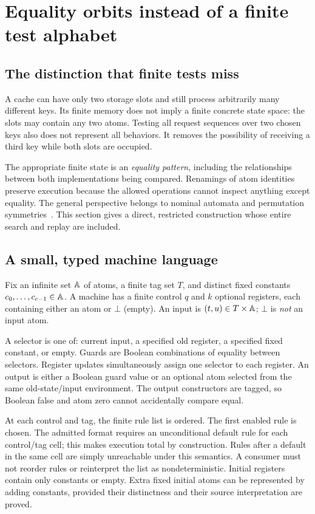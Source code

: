 \section{Equality orbits instead of a finite test alphabet}
\label{sec:orbits}

\subsection{The distinction that finite tests miss}
A cache can have only two storage slots and still process arbitrarily many
different keys. Its finite memory does not imply a finite concrete state space:
the slots may contain any two atoms. Testing all request sequences over two
chosen keys also does not represent all behaviors. It removes the possibility
of receiving a third key while both slots are occupied.

The appropriate finite state is an \emph{equality pattern}, including the
relationships between both implementations being compared. Renamings of atom
identities preserve execution because the allowed operations cannot inspect
anything except equality. The general perspective belongs to nominal automata
and permutation symmetries~\cite{nominal}. This section gives a direct,
restricted construction whose entire search and replay are included.

\subsection{A small, typed machine language}
Fix an infinite set $\mathbb A$ of atoms, a finite tag set $T$, and distinct fixed
constants $c_0,\ldots,c_{c-1}\in\mathbb A$. A machine has a finite control $q$ and
$k$ optional registers, each containing either an atom or $\bot$ (empty).
An input is $(t,u)\in T\times\mathbb A$; $\bot$ is \emph{not} an input atom.

A selector is one of: current input, a specified old register, a specified
fixed constant, or empty. Guards are Boolean combinations of equality between
selectors. Register updates simultaneously assign one selector to each register.
An output is either a Boolean guard value or an optional atom selected from the
same old-state/input environment. The output constructors are tagged, so
Boolean false and atom zero cannot accidentally compare equal.

At each control and tag, the finite rule list is ordered. The first enabled
rule is chosen. The admitted format requires an unconditional default rule for
each control/tag cell; this makes execution total by construction. Rules after
a default in the same cell are simply unreachable under this semantics. A
consumer must not reorder rules or reinterpret the list as nondeterministic.
Initial registers contain only constants or empty. Extra fixed initial atoms
can be represented by adding constants, provided their distinctness and their
source interpretation are proved.

